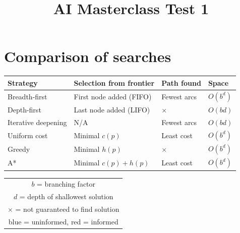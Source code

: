 \documentclass[12pt, a4paper]{article}
\title{AI Masterclass Test 1}
\author{}
\date{}
\begin{document}
\section{Comparison of searches}
\begin{table}[h]
\centering
\begin{tabular}{|l|l|l|l|}
\hline
\textbf{Strategy} & \textbf{Selection from frontier} & \textbf{Path found} & \textbf{Space} \\ \hline
{\color{blue} Breadth-first} & First node added (FIFO) & Fewest arcs & $O(b^d)$ \\ \hline
{\color{blue} Depth-first} & Last node added (LIFO) & $\times$ & $O(bd)$ \\ \hline
{\color{blue} Iterative deepening} & N/A & Fewest arcs & $O(bd)$ \\ \hline
{\color{red} Uniform cost} & Minimal $c(p)$ & Least cost & $O(b^d)$ \\ \hline
{\color{red} Greedy} & Minimal $h(p)$ & $\times$ & $O(b^d)$ \\ \hline
{\color{red} A*} & Minimal $c(p) + h(p)$ & Least cost & $O(b^d)$ \\ \hline
\end{tabular}

\vspace{1em}
\small
\begin{tabular}{c}
$b$ = branching factor \\
$d$ = depth of shallowest solution \\
$\times$ = not guaranteed to find solution \\
{\color{blue} blue} = uninformed, {\color{red} red} = informed
\end{tabular}
\end{table}
\end{document}
